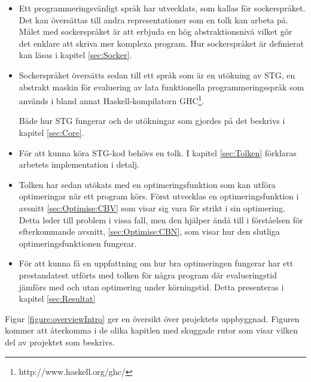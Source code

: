 \documentclass[Rapport]{subfiles}
\begin{document}
\begin{itemize}
    \item Ett programmeringsvänligt språk har
          utvecklats, som kallas för sockerspråket. Det 
          kan översättas till andra representationer som en tolk kan arbeta på. Målet med sockerspråket är att erbjuda en hög abstraktionsnivå vilket gör det enklare att skriva mer komplexa program.
Hur sockerspråket är definierat
          kan läsas i kapitel \ref{sec:Socker}.
          
    \item Sockerspråket översätts sedan till ett språk som är en utökning 
          av STG, en abstrakt maskin för evaluering av
          lata funktionella programmeringsspråk \cite{stg} som används i bland annat
          Haskell-kompilatorn GHC\footnote{http://www.haskell.org/ghc/}. 

          Både hur STG fungerar och de utökningar som gjordes på det beskrivs
          i kapitel \ref{sec:Core}.
    
    \item För att kunna köra STG-kod behövs en tolk. 
          I kapitel \ref{sec:Tolken} förklaras arbetets implementation i detalj.
    
    \item Tolken har sedan utökats med en optimeringsfunktion som kan utföra optimeringar
          när ett program körs. Först utvecklas en optimeringsfunktion i avsnitt 
          \ref{sec:Optimise:CBV} som visar sig vara för strikt i sin optimering.
          Detta leder till problem i vissa fall, men den hjälper ändå till
          i förståelsen för efterkommande avsnitt, \ref{sec:Optimise:CBN}, som visar hur
          den slutliga optimeringsfunktionen fungerar.
    
    \item För att kunna få en uppfattning om hur bra optimeringen fungerar har
          ett prestandatest utförts med tolken för några program där 
          evalueringstid jämförs med och utan optimering under körningstid. 
          Detta presenteras i kapitel \ref{sec:Resultat}
    
\end{itemize}

Figur \ref{figure:overviewIntro} ger en översikt över projektets uppbyggnad. Figuren kommer
att återkomma i de olika kapitlen med skuggade rutor som visar 
vilken del av projektet som beskrivs.
\end{document}
